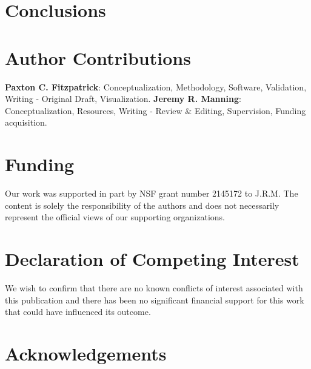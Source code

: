 \documentclass[preprint,12pt, a4paper]{elsarticle}
\begin{document}







\section{Conclusions}


\section*{Author Contributions}
\textbf{Paxton C. Fitzpatrick}: Conceptualization, Methodology, Software, Validation, Writing - Original Draft, Visualization. \textbf{Jeremy R. Manning}: Conceptualization, Resources, Writing - Review \& Editing, Supervision, Funding acquisition.

\section*{Funding}
Our work was supported in part by NSF grant number 2145172 to J.R.M.
The content is solely the responsibility of the authors and does not necessarily represent the official views of our supporting organizations.


\section*{Declaration of Competing Interest}
We wish to confirm that there are no known conflicts of interest associated with this publication and there has been no significant financial support for this work that could have influenced its outcome.


\section*{Acknowledgements}




\end{document}
